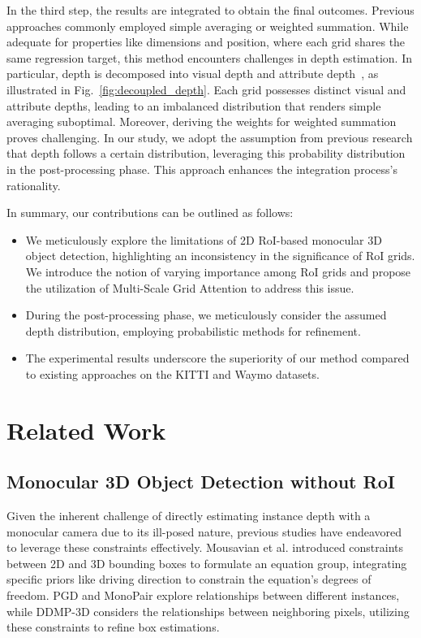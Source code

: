 \documentclass[journal]{IEEEtran}
\begin{document}
	In the third step, the results are integrated to obtain the final outcomes. Previous approaches commonly employed simple averaging or weighted summation. While adequate for properties like dimensions and position, where each grid shares the same regression target, this method encounters challenges in depth estimation. In particular, depth is decomposed into visual depth and attribute depth~\cite{didm3d}, as illustrated in Fig.~\ref{fig:decoupled_depth}. Each grid possesses distinct visual and attribute depths, leading to an imbalanced distribution that renders simple averaging suboptimal. Moreover, deriving the weights for weighted summation proves challenging. In our study, we adopt the assumption from previous research that depth follows a certain distribution, leveraging this probability distribution in the post-processing phase. This approach enhances the integration process's rationality.
	
	
	In summary, our contributions can be outlined as follows:
	\begin{itemize}
		\item We meticulously explore the limitations of 2D RoI-based monocular 3D object detection, highlighting an inconsistency in the significance of RoI grids. We introduce the notion of varying importance among RoI grids and propose the utilization of Multi-Scale Grid Attention to address this issue.
		\item During the post-processing phase, we meticulously consider the assumed depth distribution, employing probabilistic methods for refinement.
		\item The experimental results underscore the superiority of our method compared to existing approaches on the KITTI and Waymo datasets.
	\end{itemize}
	
	\section{Related Work}
	\subsection{Monocular 3D Object Detection without RoI}
	Given the inherent challenge of directly estimating instance depth with a monocular camera due to its ill-posed nature, previous studies have endeavored to leverage these constraints effectively. Mousavian et al. \cite{geometry3d} introduced constraints between 2D and 3D bounding boxes to formulate an equation group, integrating specific priors like driving direction to constrain the equation's degrees of freedom. PGD \cite{pgd} and MonoPair \cite{monopair} explore relationships between different instances, while DDMP-3D \cite{ddmp-3d} considers the relationships between neighboring pixels, utilizing these constraints to refine box estimations.
	
\end{document}
